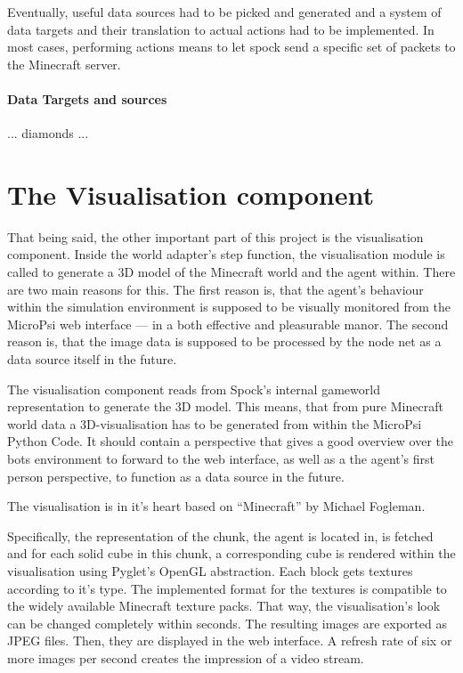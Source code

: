 Eventually, useful data sources had to be picked and generated and a system of data targets and their translation to actual actions had to be implemented. In most cases, performing actions means to let spock send a specific set of packets to the Minecraft server.

\paragraph{Data Targets and sources}

... diamonds ...


    \section{The Visualisation component}
That being said, the other important part of this project is the visualisation component. Inside the world adapter's step function, the visualisation module is called to generate a 3D model of the Minecraft world and the agent within. There are two main reasons for this. The first reason is, that the agent's behaviour within the simulation environment is supposed to be visually monitored from the MicroPsi web interface --- in a both effective and pleasurable manor. The second reason is, that the image data is supposed to be processed by the node net as a data source itself in the future.

The visualisation component reads from Spock's internal gameworld representation to generate the 3D model. This means, that from pure Minecraft world data a 3D-visualisation has to be generated from within the MicroPsi Python Code. It should contain a perspective that gives a good overview over the bots environment to forward to the web interface, as well as a the agent's first person perspective, to function as a data source in the future.  

The visualisation is in it's heart based on ``Minecraft'' by Michael Fogleman.

Specifically, the representation of the chunk, the agent is located in, is fetched and for each solid cube in this chunk, a corresponding cube is rendered within the visualisation using Pyglet's OpenGL abstraction. Each block gets textures according to it's type. The implemented format for the textures is compatible to the widely available Minecraft texture packs. That way, the visualisation's look can be changed completely within seconds. The resulting images are exported as JPEG files. Then, they are displayed in the web interface. A refresh rate of six or more images per second creates the impression of a video stream.

